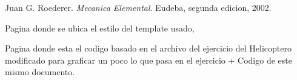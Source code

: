 \documentclass[fleqn,10pt]{SelfArx} %
\begin{document}

\begin{thebibliography}{9}
Juan G. Roederer. 
\textit{Mecanica Elemental}. 
Eudeba, segunda edicion, 2002.


Pagina donde se ubica el estilo del template usado,
\\\href{http://www.latextemplates.com/}{\color{B}{Latex Template}}

Pagina donde esta el codigo basado en el archivo del ejercicio del Helicoptero 
modificado para graficar un poco lo que pasa en el ejercicio + Codigo de este mismo documento.
\\\href{http://www.latextemplates.com/}{\color{B}{Repo Git}}
\end{thebibliography}



\end{document}
